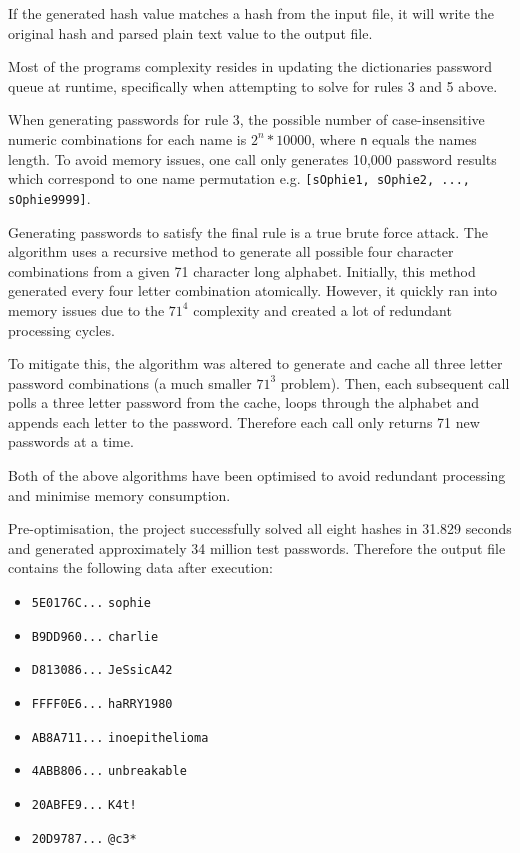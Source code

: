 \documentclass[journal,comsoc]{IEEEtran}
\begin{document}
	If the generated hash value matches a hash from the input file, it will write the original hash and parsed plain text value to the output file.
	
	Most of the programs complexity resides in updating the dictionaries password queue at runtime, specifically when attempting to solve for rules 3 and 5 above. 
	
	When generating passwords for rule 3, the possible number of case-insensitive numeric combinations for each name is \texttt{$2^{n}*10000$}, where \texttt{n} equals the names length. To avoid memory issues, one call only generates 10,000 password results which correspond to one name permutation e.g. \texttt{[sOphie1, sOphie2, ..., sOphie9999]}.
	
	Generating passwords to satisfy the final rule is a true brute force attack. The algorithm uses a recursive method to generate all possible four character combinations from a given 71 character long alphabet. Initially, this method generated every four letter combination atomically. However, it quickly ran into memory issues due to the \texttt{$71^{4}$} complexity and created a lot of redundant processing cycles. 
	
	To mitigate this, the algorithm was altered to generate and cache all three letter password combinations (a much smaller \texttt{$71^{3}$} problem). Then, each subsequent call polls a three letter password from the cache, loops through the alphabet and appends each letter to the password. Therefore each call only returns 71 new passwords at a time.
	
	Both of the above algorithms have been optimised to avoid redundant processing and minimise memory consumption.	
	
	Pre-optimisation, the project successfully solved all eight hashes in 31.829 seconds and generated approximately 34 million test passwords. Therefore the output file contains the following data after execution:
	
	\begin{itemize}
		\item \texttt{5E0176C...} \texttt{sophie}
		\item \texttt{B9DD960...} \texttt{charlie}
		\item \texttt{D813086...} \texttt{JeSsicA42}
		\item \texttt{FFFF0E6...} \texttt{haRRY1980}
		\item \texttt{AB8A711...} \texttt{inoepithelioma}
		\item \texttt{4ABB806...} \texttt{unbreakable}
		\item \texttt{20ABFE9...} \texttt{K4t!}
		\item \texttt{20D9787...} \texttt{@c3*}
	\end{itemize}
\end{document}
